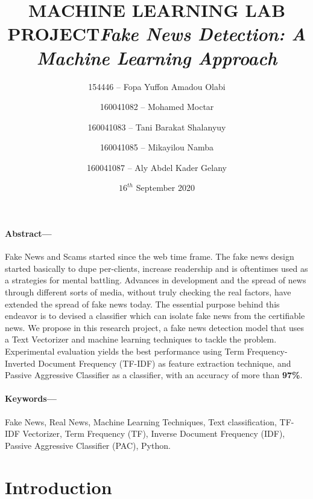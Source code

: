 \documentclass[11.5pt]{article}
\title{\textbf{MACHINE LEARNING LAB PROJECT}\hr \textit{\textbf{Fake News Detection: A Machine Learning Approach}}\hr}
\author[1]{154446 -- Fopa Yuffon Amadou Olabi}
\author[2]{160041082 -- Mohamed Moctar}
\author[3]{160041083 -- Tani Barakat Shalanyuy}
\author[4]{160041085 -- Mikayilou Namba}
\author[5]{160041087 -- Aly Abdel Kader Gelany}
\affil[1]{$^{,2,3,4,5}$ Department of Computer Science and Engineering, Islamic University of Technology\hr}
\date{$16^{th}$ September 2020}
\begin{document}
\maketitle
\begin{multicols}{2}

\paragraph{Abstract---}
Fake News and Scams started since the web time frame. The fake news design started basically to dupe per-clients, increase readership and is oftentimes used as a strategies for mental battling. Advances in development and the spread of news through different sorts of media, without truly checking the real factors, have extended the spread of fake news today. The essential purpose behind this endeavor is to devised a classifier which can isolate fake news from the certifiable news.
\newline
We propose in this research project, a fake news detection model that uses a Text Vectorizer and machine learning techniques to tackle the problem.
Experimental evaluation yields the best performance using Term Frequency-Inverted Document Frequency (TF-IDF) as feature extraction technique, and Passive Aggressive Classifier as a classifier, with an accuracy of more than \textbf{97\%}. 

\paragraph{Keywords---}
Fake News, Real News, Machine Learning Techniques, Text classification, TF-IDF Vectorizer, Term Frequency (TF), Inverse Document Frequency (IDF), Passive Aggressive Classifier (PAC), Python.

\section{Introduction}

\end{multicols}
\end{document}
